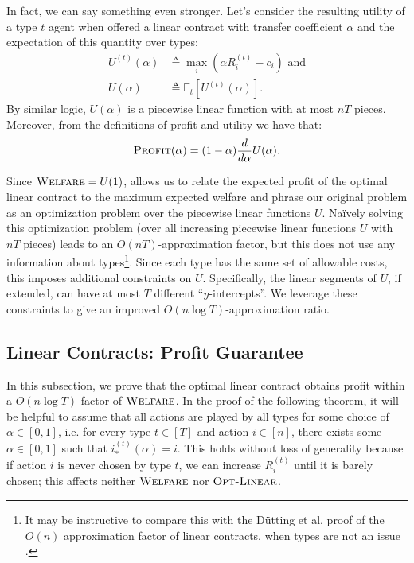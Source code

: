 \documentclass{article}
\newcommand{\jonnote}[1]{}
\newcommand{\E}{\mathbb{E}}
\newcommand{\Derivative}[1]{\frac{d}{d#1}}
\newcommand{\Cost}[1]{c_{#1}}
\newcommand{\TypedExpectedReward}[2]{R^{(#1)}_{#2}}
\newcommand{\TransferCoefficient}{\alpha}
\newcommand{\OptimalAction}{i_*}
\newcommand{\TypedOptimalAction}[1]{\OptimalAction^{(#1)}}
\newcommand{\Profit}{\textsc{Profit}}
\newcommand{\Utility}{U}
\newcommand{\OWelfare}{\textsc{Welfare}}
\newcommand{\OLinear}{\textsc{Opt-Linear}}
\newcommand{\dutting}{D{\"u}tting}
\newcommand{\Naively}{Na{\"i}vely}
\begin{document}
In fact, we can say something even stronger. Let's consider the resulting utility of a type $t$ agent when offered a linear contract with transfer coefficient $\TransferCoefficient$ and the expectation of this quantity over types:
\begin{align*}
  \Utility^{(t)}(\TransferCoefficient) &\triangleq \max_i \left( \alpha \TypedExpectedReward{t}{i} - \Cost{i} \right)\text{ and} \\
  \Utility(\TransferCoefficient)       &\triangleq \E_t \left[ \Utility^{(t)}(\TransferCoefficient) \right] \text{.}
\end{align*}
By similar logic, $\Utility(\TransferCoefficient)$ is a piecewise linear function with at most $nT$ pieces. Moreover, from the definitions of profit and utility we have that:
\begin{align}
  \label{eq:profit-utility}
  \Profit(\TransferCoefficient) = (1-\TransferCoefficient) \Derivative{\TransferCoefficient} \Utility(\TransferCoefficient)\text{.}
\end{align}

Since $\OWelfare = \Utility(1)$,  allows us to relate the expected profit of the optimal linear contract to the maximum expected welfare and phrase our original problem as an optimization problem over the piecewise linear functions $\Utility$. \Naively{} solving this optimization problem (over all increasing piecewise linear functions $\Utility$ with $nT$ pieces) leads to an $O(nT)$-approximation factor, but this does not use any information about types\footnote{It may be instructive to compare this with the \dutting{} et al. proof of the $O(n)$ approximation factor of linear contracts, when types are not an issue \cite{dutting2019simple}.}. Since each type has the same set of allowable costs, this imposes additional constraints on $\Utility$. Specifically, the linear segments of $\Utility$, if extended, can have at most $T$ different ``$y$-intercepts''. We leverage these constraints to give an improved $O(n \log T)$-approximation ratio.

\subsection{Linear Contracts: Profit Guarantee}

In this subsection, we prove that the optimal linear contract obtains profit within a $O(n \log T)$ factor of $\OWelfare$. In the proof of the following theorem, it will be helpful to assume that all actions are played by all types for some choice of $\TransferCoefficient \in [0, 1]$, i.e. for every type $t \in [T]$ and action $i \in [n]$, there exists some $\TransferCoefficient \in [0, 1]$ such that $\TypedOptimalAction{t}(\TransferCoefficient) = i$. This holds without loss of generality because if action $i$ is never chosen by type $t$, we can increase $\TypedExpectedReward{t}{i}$ until it is barely chosen; this affects neither $\OWelfare$ nor $\OLinear$. 
\end{document}
